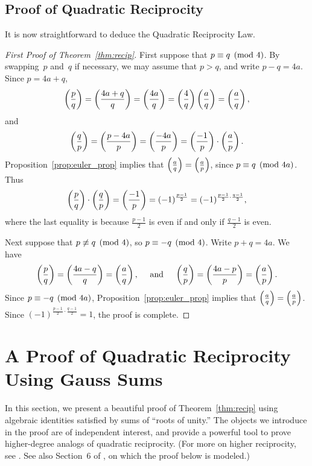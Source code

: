 \subsection{Proof of Quadratic Reciprocity}\label{sec:qr_proof_q}
It is now straightforward to deduce the Quadratic Reciprocity Law.
\begin{proof}[First Proof of Theorem~\ref{thm:recip}]
  First suppose that $p\equiv q\pmod{4}$.  By swapping~$p$ and~$q$ if
  necessary, we may assume that $p>q$, and write $p-q=4a$.  Since
  $p=4a+q$,
  $$\left(\frac{p}{q}\right) = \left(\frac{4a+q}{q}\right) = \left(\frac{4a}{q}\right) = \left(\frac{4}{q}\right) \left(\frac{a}{q}\right) =
  \left(\frac{a}{q}\right),$$
  and
  $$\left(\frac{q}{p}\right) = \left(\frac{p-4a}{p}\right) = \left(\frac{-4a}{p}\right) = \left(\frac{-1}{p}\right)\cdot
  \left(\frac{a}{p}\right).$$
  Proposition~\ref{prop:euler_prop} implies that
  $\left(\frac{a}{q}\right) = \left(\frac{a}{p}\right)$, since $p\equiv q\pmod{4a}$.  Thus
  $$\left(\frac{p}{q}\right)\cdot\left(\frac{q}{p}\right) = \left(\frac{-1}{p}\right) = (-1)^{\frac{p-1}{2}} =
  (-1)^{\frac{p-1}{2}\cdot \frac{q-1}{2}},$$
  where the last equality
  is because $\frac{p-1}{2}$ is even if and only if $\frac{q-1}{2}$ is
  even.

  Next suppose that $p\not\equiv q\pmod{4}$, so $p\equiv -q\pmod{4}$.
  Write $p+q=4a$.  We have
  $$\left(\frac{p}{q}\right) = \left(\frac{4a-q}{q}\right) = \left(\frac{a}{q}\right), \quad\text{ and }\quad
  \left(\frac{q}{p}\right) = \left(\frac{4a-p}{p}\right) = \left(\frac{a}{p}\right).$$
  Since $p\equiv -q\pmod{4a}$,
  Proposition~\ref{prop:euler_prop} implies that
  $\left(\frac{a}{q}\right)=\left(\frac{a}{p}\right)$.  Since $(-1)^{\frac{p-1}{2}\cdot
    \frac{q-1}{2}}=1$, the proof is complete.
\end{proof}

\section{A Proof of Quadratic Reciprocity Using Gauss Sums}
\label{sec:qr2}


In this section, we present a beautiful proof of
Theorem~\ref{thm:recip} using algebraic identities satisfied by sums
of ``roots of unity.''  The objects we introduce in the proof are of
independent interest, and provide a powerful tool to prove
higher-degree analogs of quadratic reciprocity.  (For more on higher
reciprocity, see \cite{ireland-rosen}.  See also Section~6 of
\cite{ireland-rosen}, on which the proof below is modeled.)


